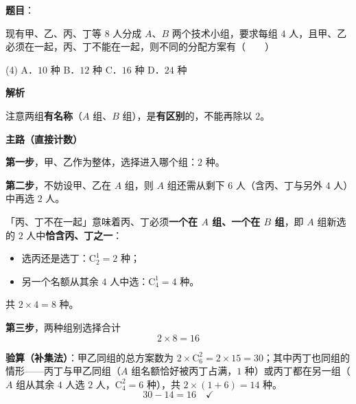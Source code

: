 \begin{answer}

\textbf{题目}：

现有甲、乙、丙、丁等 $8$ 人分成 $A$、$B$ 两个技术小组，要求每组 $4$ 人，且甲、乙必须在一起，丙、丁不能在一起，则不同的分配方案有\mbox{（　　）}

\begin{gkopts}(4)
\task A．$10$ 种
\task B．$12$ 种
\task C．$16$ 种
\task D．$24$ 种
\end{gkopts}

\textbf{解析}

注意两组\textbf{有名称}（$A$ 组、$B$ 组），是\textbf{有区别}的，不能再除以 $2$。

\textbf{主路（直接计数）}

\textbf{第一步}，甲、乙作为整体，选择进入哪个组：$2$ 种。

\textbf{第二步}，不妨设甲、乙在 $A$ 组，则 $A$ 组还需从剩下 $6$ 人（含丙、丁与另外 $4$ 人）中再选 $2$ 人。

「丙、丁不在一起」意味着丙、丁必须\textbf{一个在 $A$ 组、一个在 $B$ 组}，即 $A$ 组新选的 $2$ 人中\textbf{恰含丙、丁之一}：
\begin{itemize}
\item 选丙还是选丁：$\mathrm{C}_2^1=2$ 种；
\item 另一个名额从其余 $4$ 人中选：$\mathrm{C}_4^1=4$ 种。
\end{itemize}

共 $2\times4=8$ 种。

\textbf{第三步}，两种组别选择合计
\nopagebreak[4]
\[2\times8=16\]

\begin{gktip}
\textbf{验算（补集法）}：甲乙同组的总方案数为 $2\times\mathrm{C}_6^2=2\times15=30$；其中丙丁也同组的情形——丙丁与甲乙同组（$A$ 组名额恰好被丙丁占满，$1$ 种）或丙丁都在另一组（$A$ 组从其余 $4$ 人选 $2$ 人，$\mathrm{C}_4^2=6$ 种），共 $2\times(1+6)=14$ 种。
\nopagebreak[4]
\[30-14=16\quad\checkmark\]
\end{gktip}


\par\medskip

\end{answer}
